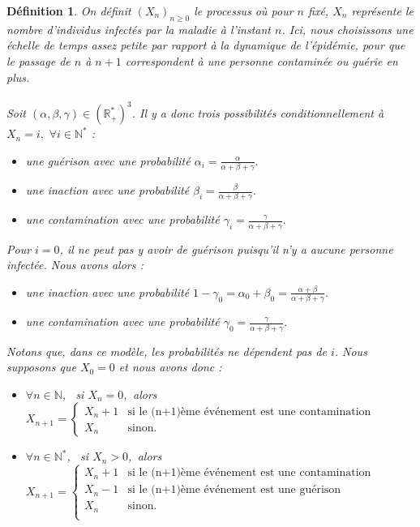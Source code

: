 \documentclass[12pt,a4paper]{report}
\newtheorem{definition}{Définition}[section]
\theoremstyle{remark}
\begin{document}
\begin{definition}\label{def_modele_simple}
On définit $(X_n)_{n\geq0}$ le processus où pour $n$ fixé, $X_n$  représente le nombre d'individus infectés par la maladie à l'instant $n$. Ici, nous choisissons une échelle de temps assez petite par rapport à la dynamique de l'épidémie, pour que le passage de $n$ à $n+1$ correspondent à une personne contaminée ou guérie en plus. 
\\
\\
Soit $(\alpha, \beta, \gamma) \in (\mathbb{R}_+^*)^3$. Il y a donc trois possibilités conditionnellement à $X_n = i, \, \, \forall i \in \mathbb{N}^*$ : 
\\
\begin{itemize}
\item une guérison avec une probabilité $\alpha_i=\frac{\alpha}{\alpha+\beta+\gamma}.$
\item une inaction avec une probabilité $\beta_i=\frac{\beta}{\alpha+\beta+\gamma}.$
\item une contamination avec une probabilité $\gamma_i=\frac{\gamma}{\alpha+\beta+\gamma}.$
\end{itemize}
\vspace{0.5cm}
Pour $i=0$, il ne peut pas y avoir de guérison puisqu'il n'y a aucune personne infectée. Nous avons alors :
\\
\begin{itemize}
\item une inaction avec une probabilité $1-\gamma_0=\alpha_0 + \beta_0 = \frac{\alpha + \beta}{\alpha+\beta+\gamma}.$
\item une contamination avec une probabilité $\gamma_0=\frac{\gamma}{\alpha+\beta+\gamma}.$
\end{itemize}
\vspace{0.5cm}

Notons que, dans ce modèle, les probabilités ne dépendent pas de $i$. Nous supposons que $X_{0} = 0$ et nous avons donc :
\begin{itemize}
\item $\forall n \in \mathbb{N}$, \, si $X_n=0$,\, alors $X_{n+1} = \left\{
    \begin{array}{ll}
        X_n+1 & \mbox{si le (n+1)ème événement est une contamination } \\
        X_n & \mbox{sinon. }
    \end{array}
\right. $
\item $\forall n \in \mathbb{N}^*$, \, si $X_n > 0$,\, alors $X_{n+1} = \left\{
    \begin{array}{ll}
        X_n+1 & \mbox{si le (n+1)ème événement est une contamination} \\
        X_n-1 & \mbox{si le (n+1)ème événement est une guérison} \\
        X_n & \mbox{sinon. }\\
    \end{array}
\right. $
\end{itemize}
\end{definition}
\end{document}
